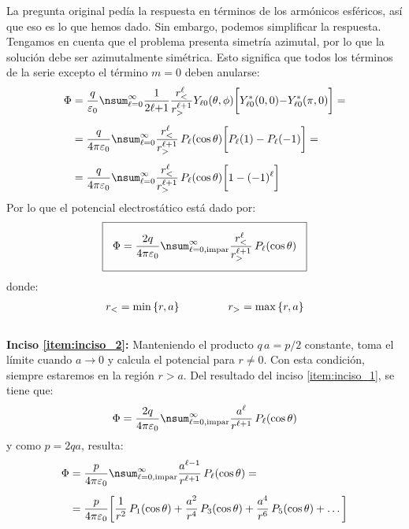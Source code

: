 La pregunta original pedía la respuesta en términos de los armónicos esféricos, así que eso es lo que hemos dado. Sin embargo, podemos simplificar la respuesta. Tengamos en cuenta que el problema presenta simetría azimutal, por lo que la solución debe ser azimutalmente simétrica. Esto significa que todos los términos de la serie excepto el término $m = 0$ deben anularse:
\begin{align*}
\Phi &= \dfrac{q}{\varepsilon_{0}} \nsum_{\ell=0}^{\infty}  \dfrac{1}{2 \ell {+} 1} \dfrac{r_{<}^{\ell}}{r_{>}^{\ell+1}} Y_{\ell 0} (\theta, \phi) \bigg[ Y_{\ell 0}^{*} (0, 0) {-} Y_{\ell 0}^{*} (\pi, 0) \bigg] = \\[0.5em]
&= \dfrac{q}{4 \pi \varepsilon_{0}} \nsum_{\ell=0}^{\infty} \dfrac{r_{<}^{\ell}}{r_{>}^{\ell+1}} \, P_{\ell} (\cos \theta) \bigg[ P_{\ell} (1) - P_{\ell} (-1) \bigg] = \\[0.5em]
&= \dfrac{q}{4 \pi \varepsilon_{0}} \nsum_{\ell=0}^{\infty} \dfrac{r_{<}^{\ell}}{r_{>}^{\ell+1}} \, P_{\ell} (\cos \theta) \bigg[ 1 - (-1)^{\ell} \bigg]
\end{align*}
Por lo que el potencial electrostático está dado por:
\begin{align*}
\setlength{\fboxsep}{3\fboxsep}\boxed{
\Phi = \dfrac{2 q}{4 \pi \varepsilon_{0}} \nsum_{\ell=0, \text{impar}}^{\infty} \dfrac{r_{<}^{\ell}}{r_{>}^{\ell+1}} \, P_{\ell} (\cos \theta)}
\end{align*}
donde:
\begin{align*}
r_{<} = \min \left\{ r, a \right\} \hspace{1.5cm} r_{>} = \max \left\{ r, a \right\}
\end{align*}
\\[1em]
\noindent
\textbf{Inciso \ref{item:inciso_2}: } Manteniendo el producto $q \, a = p /2$ constante, toma el límite cuando $a \to 0$ y calcula el potencial para $r \neq 0$. Con esta condición, siempre estaremos en la región $r > a$. Del resultado del inciso \ref{item:inciso_1}, se tiene que:
\begin{align*}
\Phi = \dfrac{2 q}{4 \pi \varepsilon_{0}} \nsum_{\ell=0, \text{impar}}^{\infty} \dfrac{a^{\ell}}{r^{\ell+1}} \, P_{\ell} (\cos \theta)
\end{align*}    
y como $p = 2 q a$, resulta:
\begin{align*}
\Phi &= \dfrac{p}{4 \pi \varepsilon_{0}} \nsum_{\ell=0, \text{impar}}^{\infty} \dfrac{a^{\ell-1}}{r^{\ell+1}} \, P_{\ell} (\cos \theta) = \\[0.5em]
&= \dfrac{p}{4 \pi \varepsilon_{0}} \bigg[ \dfrac{1}{r^{2}} \, P_{1} (\cos \theta) + \dfrac{a^{2}}{r^{4}} \, P_{3} (\cos \theta) + \dfrac{a^{4}}{r^{6}} \, P_{5} (\cos \theta) + \ldots \bigg]
\end{align*}

